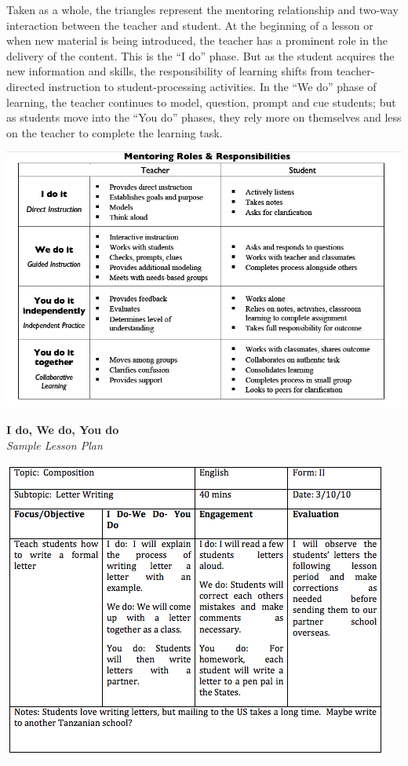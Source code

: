 Taken as a whole, the triangles represent the mentoring relationship and two-way interaction between the teacher and student. At the beginning of a lesson or when new material is being introduced, the teacher has a prominent role in the delivery of the content. This is the ``I do'' phase. But as the student acquires the new information and skills, the responsibility of learning shifts from teacher-directed instruction to student-processing activities. In the ``We do'' phase of learning, the teacher continues to model, question, prompt and cue students; but as students move into the ``You do'' phases, they rely more on themselves and less on the teacher to complete the learning task.

\begin{center}
\includegraphics[scale=.5]{./img/i-do-you-do.png} 
\end{center}

\newpage
\begin{center}
\textbf{I do, We do, You do }\\
\textit{Sample Lesson Plan}
\end{center}

\begin{center}
\includegraphics[scale=.8]{./img/picture-6.png} 
\end{center}

